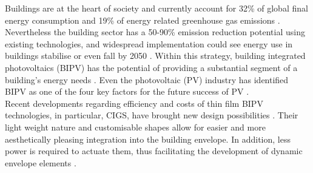 
Buildings are at the heart of society and currently account for 32\% of global final energy consumption and 19\% of energy related greenhouse gas emissions \cite{IPCC}. Nevertheless the building sector has a 50-90\% emission reduction potential using existing technologies, and widespread implementation could see energy use in buildings stabilise or even fall by 2050 \cite{IPCC}. Within this strategy, building integrated photovoltaics (BIPV) has the potential of providing a substantial segment of a building's energy needs \cite{defaix2012technical}. Even the photovoltaic (PV) industry has identified BIPV as one of the four key factors for the future success of PV \cite{raugei2009life}. \\

Recent developments regarding efficiency and costs of thin film BIPV technologies, in particular, CIGS, have brought new design possibilities \cite{NREL} \cite{kushiya2014cis} \cite{kaelin2004low} \cite{jelle2012building}. Their light weight nature and customisable shapes allow for easier and more aesthetically pleasing integration into the building envelope. In addition, less power is required to actuate them, thus facilitating the development of dynamic envelope elements \cite{rossi2012adaptive}. \\





